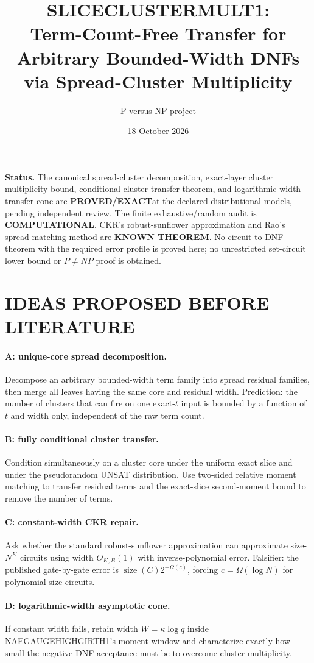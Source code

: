 \documentclass[11pt]{article}
\title{SLICECLUSTERMULT1:\\Term-Count-Free Transfer for Arbitrary Bounded-Width DNFs via Spread-Cluster Multiplicity}
\author{P versus NP project}
\date{18 October 2026}
\newcommand{\EXACT}{\textbf{PROVED/EXACT}}
\newcommand{\KNOWN}{\textbf{KNOWN THEOREM}}
\newcommand{\COMP}{\textbf{COMPUTATIONAL}}
\begin{document}
\maketitle

\noindent\textbf{Status.}
The canonical spread-cluster decomposition, exact-layer cluster multiplicity bound, conditional cluster-transfer theorem, and logarithmic-width transfer cone are \EXACT at the declared distributional models, pending independent review. The finite exhaustive/random audit is \COMP. CKR's robust-sunflower approximation and Rao's spread-matching method are \KNOWN. No circuit-to-DNF theorem with the required error profile is proved here; no unrestricted set-circuit lower bound or $P\ne NP$ proof is obtained.

\section{IDEAS PROPOSED BEFORE LITERATURE}
\paragraph{A: unique-core spread decomposition.}
Decompose an arbitrary bounded-width term family into spread residual families, then merge all leaves having the same core and residual width. Prediction: the number of clusters that can fire on one exact-$t$ input is bounded by a function of $t$ and width only, independent of the raw term count.

\paragraph{B: fully conditional cluster transfer.}
Condition simultaneously on a cluster core under the uniform exact slice and under the pseudorandom UNSAT distribution. Use two-sided relative moment matching to transfer residual terms and the exact-slice second-moment bound to remove the number of terms.

\paragraph{C: constant-width CKR repair.}
Ask whether the standard robust-sunflower approximation can approximate size-$N^K$ circuits using width $O_{K,B}(1)$ with inverse-polynomial error. Falsifier: the published gate-by-gate error is $\operatorname{size}(C)2^{-\Omega(c)}$, forcing $c=\Omega(\log N)$ for polynomial-size circuits.

\paragraph{D: logarithmic-width asymptotic cone.}
If constant width fails, retain width $W=\kappa\log q$ inside NAEGAUGEHIGHGIRTH1's moment window and characterize exactly how small the negative DNF acceptance must be to overcome cluster multiplicity.
\end{document}
